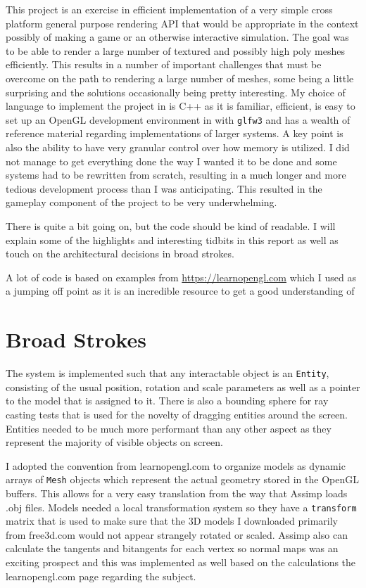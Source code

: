 \documentclass[11pt]{article}
\begin{document}
\begin{enumerate}
This project is an exercise in efficient implementation of a very simple cross platform general purpose rendering API that would be appropriate in the context possibly of making a game or an otherwise interactive simulation. The goal was to be able to render a large number of textured and possibly high poly meshes efficiently.
This results in a number of important challenges that must be overcome on the path to rendering a large number of meshes, some being a little surprising and the solutions occasionally being pretty interesting.
My choice of language to implement the project in is C++ as it is familiar, efficient, is easy to set up an OpenGL development environment in with \texttt{glfw3} and has a wealth of reference material regarding implementations of larger systems. A key point is also the ability to have very granular control over how memory is utilized.
I did not manage to get everything done the way I wanted it to be done and some systems had to be rewritten from scratch, resulting in a much longer and more tedious development process than I was anticipating. This resulted in the gameplay component of the project to be very underwhelming.

There is quite a bit going on, but the code should be kind of readable. I will explain some of the highlights and interesting tidbits in this report as well as touch on the architectural decisions in broad strokes.

A lot of code is based on examples from \url{https://learnopengl.com} which I used as a jumping off point as it is an incredible resource to get a good understanding of
\end{enumerate}

\section{Broad Strokes}
\label{sec:org50533a5}

The system is implemented such that any interactable object is an \texttt{Entity}, consisting of the usual position, rotation and scale parameters as well as a pointer to the model that is assigned to it. There is also a bounding sphere for ray casting tests that is used for the novelty of dragging entities around the screen. Entities needed to be much more performant than any other aspect as they represent the majority of visible objects on screen.

I adopted the convention from learnopengl.com to organize models as dynamic arrays of \texttt{Mesh} objects which represent the actual geometry stored in the OpenGL buffers. This allows for a very easy translation from the way that Assimp loads .obj files. Models needed a local transformation system so they have a \texttt{transform} matrix that is used to make sure that the 3D models I downloaded primarily from free3d.com would not appear strangely rotated or scaled. Assimp also can calculate the tangents and bitangents for each vertex so normal maps was an exciting prospect and this was implemented as well based on the calculations the learnopengl.com page regarding the subject.
\end{document}
